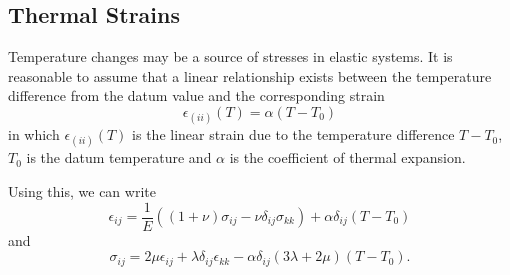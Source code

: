 
\subsection{Thermal Strains}
Temperature changes may be a source of stresses in elastic systems.
It is reasonable to assume that a linear relationship exists between the temperature difference from the datum value and the corresponding strain
\begin{equation*}
  \epsilon_{(ii)} (T) = \alpha \left( T - T_0 \right)
\end{equation*}
in which $\epsilon_{(ii)} (T)$ is the linear strain due to the temperature difference $T - T_0$, $T_0$ is the datum temperature and $\alpha$ is the coefficient of thermal expansion.

Using this, we can write
\begin{equation*}
  \epsilon_{ij} = \frac{1}{E} \left( \left( 1 + \nu \right)\sigma_{ij} - \nu \delta_{ij} \sigma_{kk} \right) + \alpha \delta_{ij} \left( T - T_0 \right)
\end{equation*}
and
\begin{equation*}
  \sigma_{ij} = 2\mu\epsilon_{ij} + \lambda \delta_{ij} \epsilon_{kk} - \alpha \delta_{ij} \left( 3 \lambda + 2\mu \right) \left( T - T_0 \right)
.\end{equation*}
